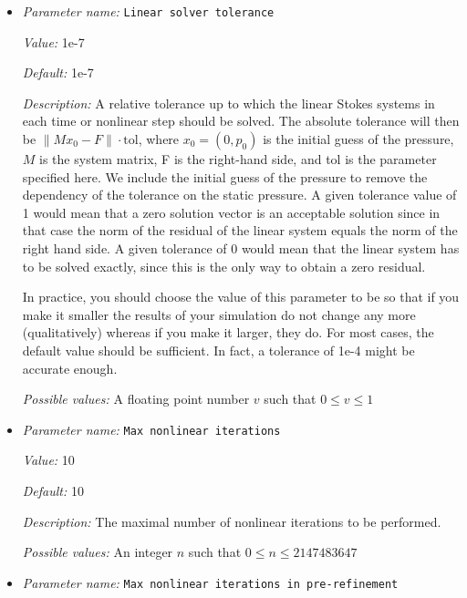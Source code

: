 \begin{itemize}
{\it Possible values:} A floating point number $v$ such that $0 \leq v \leq 1$
\item {\it Parameter name:} {\tt Linear solver tolerance}
\label{parameters:Linear solver tolerance}


{\it Value:} 1e-7


{\it Default:} 1e-7


{\it Description:} A relative tolerance up to which the linear Stokes systems in each time or nonlinear step should be solved. The absolute tolerance will then be $\| M x_0 - F \| \cdot \text{tol}$, where $x_0 = (0,p_0)$ is the initial guess of the pressure, $M$ is the system matrix, F is the right-hand side, and tol is the parameter specified here. We include the initial guess of the pressure to remove the dependency of the tolerance on the static pressure. A given tolerance value of 1 would mean that a zero solution vector is an acceptable solution since in that case the norm of the residual of the linear system equals the norm of the right hand side. A given tolerance of 0 would mean that the linear system has to be solved exactly, since this is the only way to obtain a zero residual.

In practice, you should choose the value of this parameter to be so that if you make it smaller the results of your simulation do not change any more (qualitatively) whereas if you make it larger, they do. For most cases, the default value should be sufficient. In fact, a tolerance of 1e-4 might be accurate enough.


{\it Possible values:} A floating point number $v$ such that $0 \leq v \leq 1$
\item {\it Parameter name:} {\tt Max nonlinear iterations}
\label{parameters:Max nonlinear iterations}


{\it Value:} 10


{\it Default:} 10


{\it Description:} The maximal number of nonlinear iterations to be performed.


{\it Possible values:} An integer $n$ such that $0\leq n \leq 2147483647$
\item {\it Parameter name:} {\tt Max nonlinear iterations in pre-refinement}
\label{parameters:Max nonlinear iterations in pre-refinement}



\end{itemize}
